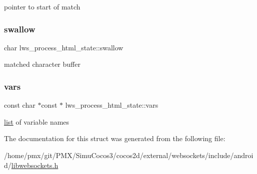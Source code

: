pointer to start of match \mbox{\label{structlws__process__html__state_a28005ed37f78cb29c5e758922907bec2}} 
\subsubsection{\texorpdfstring{swallow}{swallow}}
{\footnotesize\ttfamily char lws\+\_\+process\+\_\+html\+\_\+state\+::swallow}

matched character buffer \mbox{\label{structlws__process__html__state_ad43c2761417aecee06143f4bb2b5916a}} 
\subsubsection{\texorpdfstring{vars}{vars}}
{\footnotesize\ttfamily const char $\ast$const  $\ast$ lws\+\_\+process\+\_\+html\+\_\+state\+::vars}

\hyperlink{protocollist-p}{list} of variable names 

The documentation for this struct was generated from the following file\+:\begin{DoxyCompactItemize}
\item 
/home/pmx/git/\+P\+M\+X/\+Simu\+Cocos3/cocos2d/external/websockets/include/android/\hyperlink{_2cocos2d_2external_2websockets_2include_2android_2libwebsockets_8h}{libwebsockets.\+h}\end{DoxyCompactItemize}
